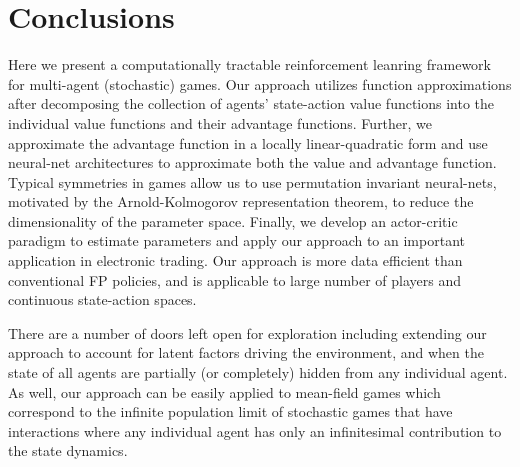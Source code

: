 \documentclass[onefignum,onetabnum]{siamonline171218}
\begin{document}
\section{Conclusions}

Here we present a computationally tractable  reinforcement leanring framework for multi-agent (stochastic) games. Our approach utilizes function approximations after decomposing the collection of agents' state-action value functions into the individual value functions and their advantage functions. Further, we approximate the advantage function in  a locally linear-quadratic form and use neural-net architectures to approximate both the value  and  advantage function. Typical symmetries in  games allow us to use permutation invariant neural-nets, motivated by the Arnold-Kolmogorov representation theorem, to reduce the dimensionality of the parameter space. Finally, we  develop an actor-critic paradigm to estimate parameters and apply our approach to an important application in electronic trading. Our approach is more data efficient than conventional FP policies, and is applicable to large number of players and continuous state-action spaces.

There are a number of doors left open for exploration including extending our approach to account for latent factors driving the environment, and when the state of all agents are partially (or completely) hidden from any individual agent. As well, our approach can be easily applied to mean-field games which correspond to the infinite population limit of stochastic games that have interactions where any individual agent has only an infinitesimal contribution to the state dynamics.



\end{document}
